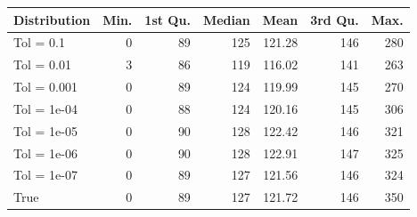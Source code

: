 \begin{figure} 
\begin{tabular}{lrrrrrr}
 Distribution & Min. & 1st Qu. & Median & Mean & 3rd Qu. & Max. \\ 
  \hline
\hline
Tol =  0.1 & 0 & 89 & 125 & 121.28 & 146 & 280 \\ 
  Tol =  0.01 & 3 & 86 & 119 & 116.02 & 141 & 263 \\ 
  Tol =  0.001 & 0 & 89 & 124 & 119.99 & 145 & 270 \\ 
  Tol =  1e-04 & 0 & 88 & 124 & 120.16 & 145 & 306 \\ 
  Tol =  1e-05 & 0 & 90 & 128 & 122.42 & 146 & 321 \\ 
  Tol =  1e-06 & 0 & 90 & 128 & 122.91 & 147 & 325 \\ 
  Tol =  1e-07 & 0 & 89 & 127 & 121.56 & 146 & 324 \\ 
  True & 0 & 89 & 127 & 121.72 & 146 & 350 \\ 
  \end{tabular}
\label{tab:SummaryTable}
\end{figure} 
